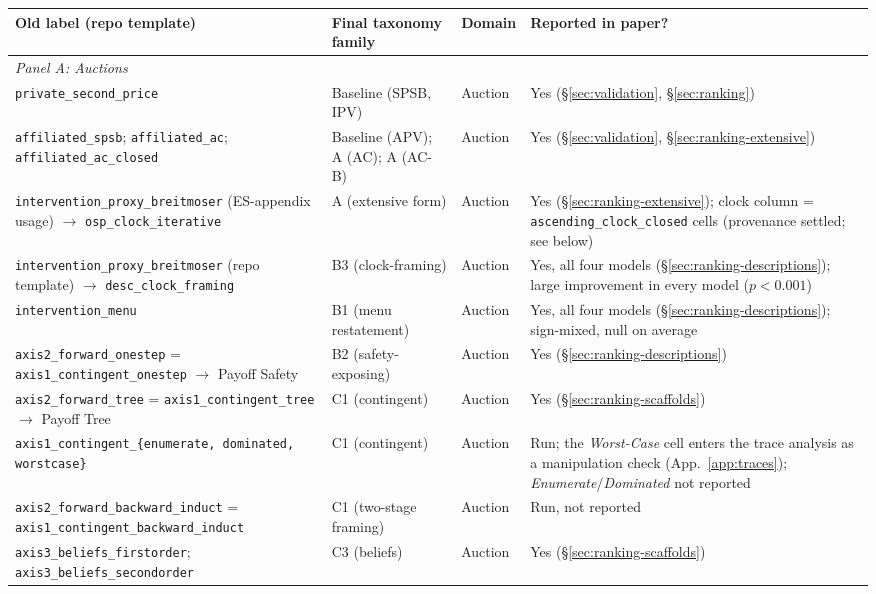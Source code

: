 \begin{table}[p]
\centering
\footnotesize
\setlength{\tabcolsep}{4pt}
\begin{tabular}{p{4.9cm} p{3.3cm} p{1.0cm} p{4.4cm}}
\toprule
\textbf{Old label (repo template)} & \textbf{Final taxonomy family} & \textbf{Domain} & \textbf{Reported in paper?} \\
\midrule
\multicolumn{4}{l}{\emph{Panel A: Auctions}} \\
\midrule
\texttt{private\_second\_price} & Baseline (SPSB, IPV) & Auction & Yes (\S\ref{sec:validation}, \S\ref{sec:ranking}) \\
\texttt{affiliated\_spsb}; \texttt{affiliated\_ac}; \texttt{affiliated\_ac\_closed} & Baseline (APV); A (AC); A (AC-B) & Auction & Yes (\S\ref{sec:validation}, \S\ref{sec:ranking-extensive}) \\
\texttt{intervention\_proxy\_breitmoser} (ES-appendix usage) $\to$ \texttt{osp\_clock\_iterative} & A (extensive form) & Auction & Yes (\S\ref{sec:ranking-extensive}); clock column = \texttt{ascending\_clock\_closed} cells (provenance settled; see below) \\
\texttt{intervention\_proxy\_breitmoser} (repo template) $\to$ \texttt{desc\_clock\_framing} & B3 (clock-framing) & Auction & Yes, all four models (\S\ref{sec:ranking-descriptions}); large improvement in every model ($p<0.001$) \\
\texttt{intervention\_menu} & B1 (menu restatement) & Auction & Yes, all four models (\S\ref{sec:ranking-descriptions}); sign-mixed, null on average \\
\texttt{axis2\_forward\_onestep} = \texttt{axis1\_contingent\_onestep} $\to$ Payoff Safety & B2 (safety-exposing) & Auction & Yes (\S\ref{sec:ranking-descriptions}) \\
\texttt{axis2\_forward\_tree} = \texttt{axis1\_contingent\_tree} $\to$ Payoff Tree & C1 (contingent) & Auction & Yes (\S\ref{sec:ranking-scaffolds}) \\
\texttt{axis1\_contingent\_\{enumerate, dominated, worstcase\}} & C1 (contingent) & Auction & Run; the \emph{Worst-Case} cell enters the trace analysis as a manipulation check (App.~\ref{app:traces}); \emph{Enumerate}/\emph{Dominated} not reported \\
\texttt{axis2\_forward\_backward\_induct} = \texttt{axis1\_contingent\_backward\_induct} & C1 (two-stage framing) & Auction & Run, not reported \\
\texttt{axis3\_beliefs\_firstorder}; \texttt{axis3\_beliefs\_secondorder} & C3 (beliefs) & Auction & Yes (\S\ref{sec:ranking-scaffolds}) \\

\end{tabular}
\end{table}

